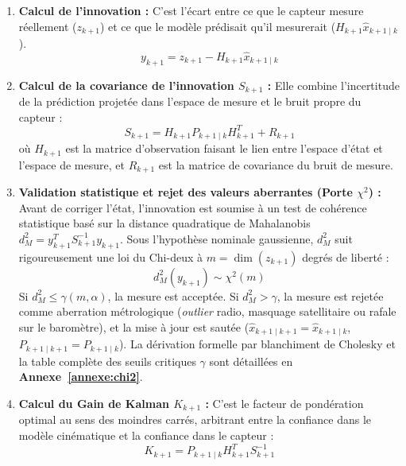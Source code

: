 \documentclass[../Formulations_Kalman.tex]{subfiles}
\begin{document}
\begin{enumerate}
    \item \textbf{Calcul de l'innovation :}
    C'est l'écart entre ce que le capteur mesure réellement ($z_{k+1}$) et ce que le modèle prédisait qu'il mesurerait ($H_{k+1} \hat{x}_{k+1\mid k}$).
    \begin{equation}
    y_{k+1} = z_{k+1} - H_{k+1} \hat{x}_{k+1\mid k}
    \end{equation}
    
    \item \textbf{Calcul de la covariance de l'innovation $S_{k+1}$ :}
    Elle combine l'incertitude de la prédiction projetée dans l'espace de mesure et le bruit propre du capteur :
    \begin{equation}
    S_{k+1} = H_{k+1} P_{k+1\mid k} H_{k+1}^T + R_{k+1}
    \end{equation}
    où $H_{k+1}$ est la matrice d'observation faisant le lien entre l'espace d'état et l'espace de mesure, et $R_{k+1}$ est la matrice de covariance du bruit de mesure.
    
    \item \textbf{Validation statistique et rejet des valeurs aberrantes (Porte $\chi^2$) :}
    Avant de corriger l'état, l'innovation est soumise à un test de cohérence statistique basé sur la distance quadratique de Mahalanobis $d_M^2 = y_{k+1}^T S_{k+1}^{-1} y_{k+1}$. Sous l'hypothèse nominale gaussienne, $d_M^2$ suit rigoureusement une loi du Chi-deux à $m = \dim(z_{k+1})$ degrés de liberté :
    \begin{equation}
    d_M^2(y_{k+1}) \sim \chi^2(m)
    \end{equation}
    Si $d_M^2 \le \gamma(m, \alpha)$, la mesure est acceptée. Si $d_M^2 > \gamma$, la mesure est rejetée comme aberration métrologique (\textit{outlier} radio, masquage satellitaire ou rafale sur le baromètre), et la mise à jour est sautée ($\hat{x}_{k+1\mid k+1} = \hat{x}_{k+1\mid k}$, $P_{k+1\mid k+1} = P_{k+1\mid k}$). La dérivation formelle par blanchiment de Cholesky et la table complète des seuils critiques $\gamma$ sont détaillées en \textbf{Annexe~\ref{annexe:chi2}}.

    \item \textbf{Calcul du Gain de Kalman $K_{k+1}$ :}
    C'est le facteur de pondération optimal au sens des moindres carrés, arbitrant entre la confiance dans le modèle cinématique et la confiance dans le capteur :
    \begin{equation}
    K_{k+1} = P_{k+1\mid k} H_{k+1}^T S_{k+1}^{-1}
    \end{equation}


\end{enumerate}
\end{document}

